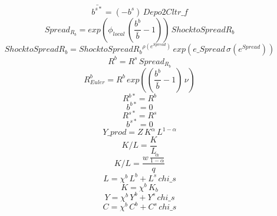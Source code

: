 \begin{dmath}
{ \bar{b^{s*}} }=\left(-{b^s}\right)\, {Depo2Cltr\_f}
\end{dmath}
\begin{dmath}
{Spread_R_b}=exp\left({\phi_{local}}\, \left(\frac{{b^b}}{{ \bar{b} }}-1\right)\right)\, {Shock to Spread R_b}
\end{dmath}
\begin{dmath}
{Shock to Spread R_b}={Shock to Spread R_b}^{{\rho(e^{Spread}) }}\, exp\left({e\_Spread}\, {\sigma(e^{Spread}) }\right)
\end{dmath}
\begin{dmath}
{R^b}={R^s}\, {Spread_R_b}
\end{dmath}
\begin{dmath}
{ R^b_{Euler} }={R^b}\, exp\left(\left(\frac{{b^b}}{{ \bar{b} }}-1\right)\, {\nu }\right)
\end{dmath}
\begin{dmath}
{R^{b*}}={R^b}
\end{dmath}
\begin{dmath}
{b^{b*}}=0
\end{dmath}
\begin{dmath}
{R^{s*}}={R^s}
\end{dmath}
\begin{dmath}
{b^{s*}}=0
\end{dmath}
\begin{dmath}
{Y\_prod}={Z}\, {K}^{{\alpha }}\, {L}^{1-{\alpha }}
\end{dmath}
\begin{dmath}
{K/L}=\frac{{K}}{{L}}
\end{dmath}
\begin{dmath}
{K/L}=\frac{{w}\, \frac{{\alpha }}{1-{\alpha }}}{{q}}
\end{dmath}
\begin{dmath}
{L}={\chi^b }\, {L^b}+{L^s}\, {chi\_s}
\end{dmath}
\begin{dmath}
{K}={\chi^b }\, {K_b}
\end{dmath}
\begin{dmath}
{Y}={\chi^b }\, {Y^b}+{Y^s}\, {chi\_s}
\end{dmath}
\begin{dmath}
{C}={\chi^b }\, {C^b}+{C^s}\, {chi\_s}
\end{dmath}
